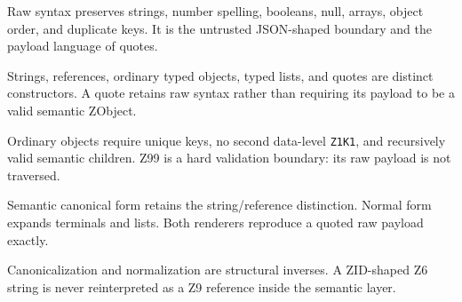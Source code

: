 \begin{definition}\label{def:raw}
  \leanok
  Raw syntax preserves strings, number spelling, booleans, null, arrays, object order, and
  duplicate keys.  It is the untrusted JSON-shaped boundary and the payload language of quotes.
\end{definition}

\begin{definition}\label{def:zobject}
  \leanok
  Strings, references, ordinary typed objects, typed lists, and quotes are distinct constructors.
  A quote retains raw syntax rather than requiring its payload to be a valid semantic ZObject.
\end{definition}

\begin{definition}\label{def:structural}
  \leanok
  Ordinary objects require unique keys, no second data-level \texttt{Z1K1}, and recursively valid
  semantic children.  Z99 is a hard validation boundary: its raw payload is not traversed.
\end{definition}

\begin{definition}\label{def:serialization}
  \leanok
  Semantic canonical form retains the string/reference distinction.  Normal form expands
  terminals and  lists.  Both renderers reproduce a quoted raw payload exactly.
\end{definition}

\begin{lemma}\label{lem:semantic-inverses}
  \leanok
  Canonicalization and normalization are structural inverses.  A ZID-shaped Z6 string is never
  reinterpreted as a Z9 reference inside the semantic layer.
\end{lemma}

